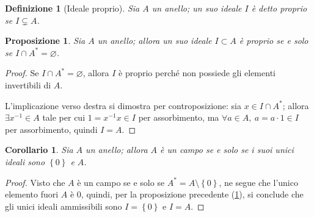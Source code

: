 \documentclass[12pt]{scrartcl}
\theoremstyle{style}
\newtheorem{definizione}{Definizione}[section]
\newtheorem{prop}{Proposizione}[section]
\newtheorem{corollario}{Corollario}[teorema]
\numberwithin{equation}{subsection}
\begin{document}
\begin{definizione}
	[Ideale proprio]
	Sia $A$ un anello; un suo ideale $I$ \`e detto \textit{proprio} se $I \subsetneq A$.
\end{definizione}
\begin{prop}\label{idprop}
	Sia $A$ un anello; allora un suo ideale $I \subset A$ \`e proprio se e solo se $I \cap A^* = \varnothing$.
\end{prop}
	\begin{proof}
		Se $I\cap A^* = \varnothing$, allora $I$ \`e proprio perch\'e non possiede gli elementi invertibili di $A$.

		L'implicazione verso destra si dimostra per controposizione: sia $x \in I\cap A^*$; allora $\exists x^{-1}\in A$ tale per cui $1=x^{-1}x \in I$ per assorbimento, ma $\forall a \in A, \ a = a \cdot 1 \in I$ per assorbimento, quindi $I=A$.
	\end{proof}
\begin{corollario}
	Sia $A$ un anello; allora $A$ \`e un campo se e solo se i suoi unici ideali sono $\left\{ 0 \right\} $ e $A$.
\end{corollario}
	\begin{proof}
		Visto che $A$ \`e un campo se e solo se $A^* = A \setminus\left\{ 0 \right\} $, ne segue che l'unico elemento fuori $A$ \`e $0$, quindi, per la proposizione precedente (\ref{idprop}), si conclude che gli unici ideali ammissibili sono $I=\left\{ 0 \right\} $ e $I=A$.
	\end{proof}
\end{document}
